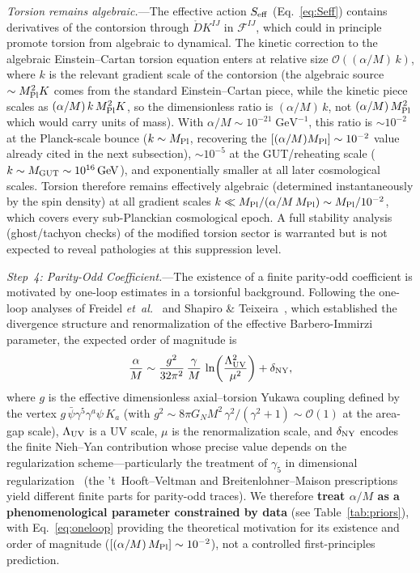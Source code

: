 \documentclass[aps,prd,twocolumn,superscriptaddress,showpacs,preprintnumbers,nofootinbib,longbibliography,floatfix]{revtex4-2}
\newcommand{\MPl}{M_{\rm Pl}}
\newcommand{\etal}{\textit{et~al.}}
\begin{document}
\textit{Torsion remains algebraic.}---The effective action $S_{\rm eff}$ (Eq.~\ref{eq:Seff}) contains derivatives of the contorsion through $\mathring{D}K^{IJ}$ in $\mathcal{F}^{IJ}$, which could in principle promote torsion from algebraic to dynamical. The kinetic correction to the algebraic Einstein--Cartan torsion equation enters at relative size $\mathcal{O}\!\left((\alpha/M)\,k\right)$, where $k$ is the relevant gradient scale of the contorsion (the algebraic source $\sim\MPl^2 K$ comes from the standard Einstein--Cartan piece, while the kinetic piece scales as $(\alpha/M)\,k\,\MPl^2 K$, so the dimensionless ratio is $(\alpha/M)\,k$, not $(\alpha/M)\,\MPl^2$ which would carry units of mass). With $\alpha/M\sim 10^{-21}\;\text{GeV}^{-1}$, this ratio is $\sim 10^{-2}$ at the Planck-scale bounce ($k\sim\MPl$, recovering the $[(\alpha/M)\MPl]\sim 10^{-2}$ value already cited in the next subsection), $\sim 10^{-5}$ at the GUT/reheating scale ($k\sim M_{\rm GUT}\sim 10^{16}\,\text{GeV}$), and exponentially smaller at all later cosmological scales. Torsion therefore remains effectively algebraic (determined instantaneously by the spin density) at all gradient scales $k\ll \MPl/(\alpha/M\,\MPl)\sim\MPl/10^{-2}$, which covers every sub-Planckian cosmological epoch. A full stability analysis (ghost/tachyon checks) of the modified torsion sector is warranted but is not expected to reveal pathologies at this suppression level.

\textit{Step~4: Parity-Odd Coefficient.}---The existence of a finite parity-odd coefficient is motivated by one-loop estimates in a torsionful background. Following the one-loop analyses of Freidel \etal~\cite{Freidel2005} and Shapiro \& Teixeira~\cite{ShapiroTeixeira2014}, which established the divergence structure and renormalization of the effective Barbero-Immirzi parameter, the expected order of magnitude is
\begin{equation}\label{eq:oneloop}
\frac{\alpha}{M}\sim \frac{g^2}{32\pi^2}\,\frac{\gamma}{M}\,\ln\!\left(\frac{\Lambda_{\rm UV}^2}{\mu^2}\right)+\delta_{\rm NY},
\end{equation}
where $g$ is the effective dimensionless axial--torsion Yukawa coupling defined by the vertex $g\,\bar{\psi}\gamma^5\gamma^a\psi\,K_a$ (with $g^2\sim 8\pi G_N M^2\,\gamma^2/(\gamma^2+1)\sim\mathcal{O}(1)$ at the area-gap scale), $\Lambda_{\rm UV}$ is a UV scale, $\mu$ is the renormalization scale, and $\delta_{\rm NY}$ encodes the finite Nieh--Yan contribution whose precise value depends on the regularization scheme---particularly the treatment of $\gamma_5$ in dimensional regularization~\cite{ShapiroTeixeira2014} (the 't~Hooft--Veltman and Breitenlohner--Maison prescriptions yield different finite parts for parity-odd traces). We therefore \textbf{treat $\alpha/M$ as a phenomenological parameter constrained by data} (see Table~\ref{tab:priors}), with Eq.~\eqref{eq:oneloop} providing the theoretical motivation for its existence and order of magnitude ($[(\alpha/M)\,\MPl]\sim 10^{-2}$), not a controlled first-principles prediction.
\end{document}
